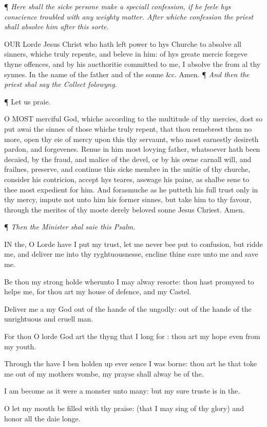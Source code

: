 ¶ \emph{Here
shall the sicke persone make a speciall confession, if he feele hys conscience
troubled with any weighty matter. After whiche confession the priest shall
absolve him after this sorte.}

OUR
Lorde Jesus Christ who hath left power to hys Churche to absolve all sinners,
whiche truly repente, and beleve in him: of hys greate mercie forgeve
thyne offences, and by his aucthoritie committed to me, I absolve the
from al thy synnes. In the name of the father and of the sonne \&c.
Amen.
¶
\emph{And then the priest shal say the Collect folowyng.}

¶
Let us praie.

O
MOST merciful God, whiche according to the multitude of thy mercies, dost
so put awai the sinnes of those whiche truly repent, that thou remebrest
them no more, open thy eie of mercy upon this thy servaunt, who most earnestly
desireth pardon, and forgevenes. Renue in him most lovying father, whatsoever
hath been decaied, by the fraud, and malice of the devel, or by his owne
carnall will, and frailnes, preserve, and continue this sicke membre in
the unitie of thy churche, consider his contricion, accept hys teares,
asswage his paine, as shalbe sene to thee most expedient for him. And
forasmuche as he putteth his full trust only in thy mercy, impute not
unto him his former sinnes, but take him to thy favour, through the merites
of thy moste derely beloved sonne Jesus Chriest. Amen.

¶
\emph{Then the Minister shal saie this Psalm.}

IN
the, O Lorde have I put my trust, let me never bee put to confusion, but
ridde me, and deliver me into thy ryghtuousnesse, encline thine eare unto
me and save me.

Be thou my strong holde wherunto I may alway resorte:
thou hast promysed to helpe me, for thou art my house of defence, and
my Castel.

Deliver me a my God out of the hande of the ungodly:
out of the hande of the unrightuous and cruell man.

For thou O lorde God art the thyng that I long for
: thou art my hope even from my youth.

Through the have I ben holden up ever sence I was borne:
thou art he that toke me out of my mothers wombe, my prayse shall alway
be of the.

I am become as it were a monster unto many: but my
sure truste is in the.

O let my mouth be filled with thy praise: (that I may
sing of thy glory) and honor all the daie longe.


